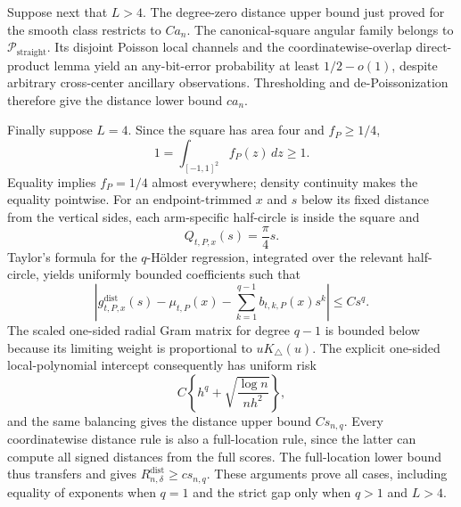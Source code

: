 Suppose next that \(L>4\).  The degree-zero distance upper bound just proved for the smooth class restricts to \(Ca_n\).  The canonical-square angular family belongs to \(\mathcal P_{\mathrm{straight}}\).  Its disjoint Poisson local channels and the coordinatewise-overlap direct-product lemma yield an any-bit-error probability at least \(1/2-o(1)\), despite arbitrary cross-center ancillary observations.  Thresholding and de-Poissonization therefore give the distance lower bound \(ca_n\).

Finally suppose \(L=4\).  Since the square has area four and \(f_P\geq1/4\),
\[
1=\int_{[-1,1]^2}f_P(z)\,dz\geq1.
\]
Equality implies \(f_P=1/4\) almost everywhere; density continuity makes the equality pointwise.  For an endpoint-trimmed \(x\) and \(s\) below its fixed distance from the vertical sides, each arm-specific half-circle is inside the square and
\[
Q_{t,P,x}(s)=\frac\pi4s.
\]
Taylor's formula for the \(q\)-H\"older regression, integrated over the relevant half-circle, yields uniformly bounded coefficients such that
\[
\left|g^{\mathrm{dist}}_{t,P,x}(s)-\mu_{t,P}(x)
-\sum_{k=1}^{q-1}b_{t,k,P}(x)s^k\right|\leq Cs^q.
\]
The scaled one-sided radial Gram matrix for degree \(q-1\) is bounded below because its limiting weight is proportional to \(uK_\triangle(u)\).  The explicit one-sided local-polynomial intercept consequently has uniform risk
\[
C\left\{h^q+\sqrt{\frac{\log n}{nh^2}}\right\},
\]
and the same balancing gives the distance upper bound \(Cs_{n,q}\).  Every coordinatewise distance rule is also a full-location rule, since the latter can compute all signed distances from the full scores.  The full-location lower bound thus transfers and gives \(R_{n,\delta}^{\mathrm{dist}}\geq cs_{n,q}\).  These arguments prove all cases, including equality of exponents when \(q=1\) and the strict gap only when \(q>1\) and \(L>4\).